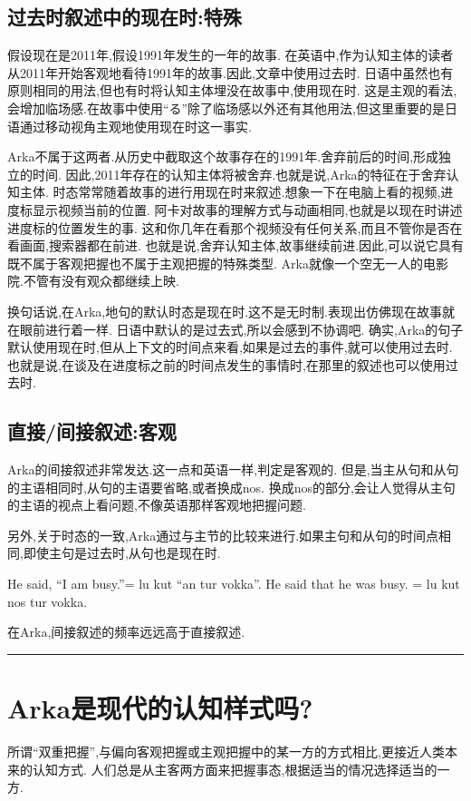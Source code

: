 \subsection{过去时叙述中的现在时:特殊}

假设现在是2011年,假设1991年发生的一年的故事.
在英语中,作为认知主体的读者从2011年开始客观地看待1991年的故事.因此,文章中使用过去时.
日语中虽然也有原则相同的用法,但也有时将认知主体埋没在故事中,使用现在时.
这是主观的看法,会增加临场感.在故事中使用“る”除了临场感以外还有其他用法,但这里重要的是日语通过移动视角主观地使用现在时这一事实.

Arka不属于这两者.从历史中截取这个故事存在的1991年.舍弃前后的时间,形成独立的时间.
因此,2011年存在的认知主体将被舍弃.也就是说,Arka的特征在于舍弃认知主体.
时态常常随着故事的进行用现在时来叙述.想象一下在电脑上看的视频,进度标显示视频当前的位置.
阿卡对故事的理解方式与动画相同,也就是以现在时讲述进度标的位置发生的事.
这和你几年在看那个视频没有任何关系,而且不管你是否在看画面,搜索器都在前进.
也就是说,舍弃认知主体,故事继续前进.因此,可以说它具有既不属于客观把握也不属于主观把握的特殊类型.
Arka就像一个空无一人的电影院.不管有没有观众都继续上映.

换句话说,在Arka,地句的默认时态是现在时.这不是无时制.表现出仿佛现在故事就在眼前进行着一样.
日语中默认的是过去式,所以会感到不协调吧.
确实,Arka的句子默认使用现在时,但从上下文的时间点来看,如果是过去的事件,就可以使用过去时.
也就是说,在谈及在进度标之前的时间点发生的事情时,在那里的叙述也可以使用过去时.

\subsection{直接/间接叙述:客观}
Arka的间接叙述非常发达.这一点和英语一样,判定是客观的.
但是,当主从句和从句的主语相同时,从句的主语要省略,或者换成nos.
换成nos的部分,会让人觉得从主句的主语的视点上看问题,不像英语那样客观地把握问题.

另外,关于时态的一致,Arka通过与主节的比较来进行.如果主句和从句的时间点相同,即使主句是过去时,从句也是现在时.

He said, “I am busy.”= lu kut ``an tur vokka''.
He said that he was busy. = lu kut nos tur vokka.

在Arka,间接叙述的频率远远高于直接叙述.
{\noindent} \rule[-10pt]{17.5cm}{0.05em}

\section{Arka是现代的认知样式吗?}
所谓“双重把握”,与偏向客观把握或主观把握中的某一方的方式相比,更接近人类本来的认知方式.
人们总是从主客两方面来把握事态,根据适当的情况选择适当的一方.

